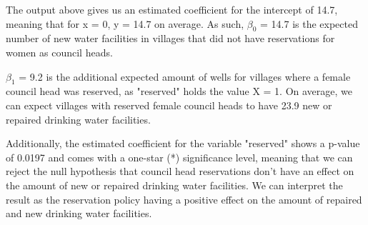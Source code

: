 \documentclass[12pt,letterpaper]{article}
\begin{document}
\begin{enumerate}
	The output above gives us an estimated coefficient for the intercept of 14.7, meaning that for x = 0, y = 14.7 on average. As such, $\beta_0$  = 14.7 is the expected number of new water facilities in villages that did not have reservations for women as council heads. 	
	
	$\beta_1$ = 9.2 is the additional expected amount of wells for villages where a female council head was reserved, as "reserved" holds the value X = 1. On average, we can expect villages with reserved female council heads to have 23.9 new or repaired drinking water facilities. 
	
	Additionally, the estimated coefficient for the variable "reserved" shows a p-value of 0.0197 and comes with a one-star (*) significance level, meaning that we can reject the null hypothesis that council head reservations don't have an effect on the amount of new or repaired drinking water facilities. We can interpret the result as the reservation policy having a positive effect on the amount of repaired and new drinking water facilities.
	 
\end{enumerate}
\end{document}

